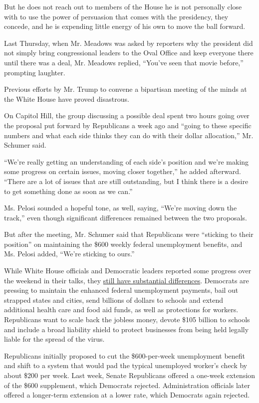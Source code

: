 But he does not reach out to members of the House he is not personally
close with to use the power of persuasion that comes with the
presidency, they concede, and he is expending little energy of his own
to move the ball forward.

Last Thursday, when Mr. Meadows was asked by reporters why the president
did not simply bring congressional leaders to the Oval Office and keep
everyone there until there was a deal, Mr. Meadows replied, ``You've
seen that movie before,'' prompting laughter.

Previous efforts by Mr. Trump to convene a bipartisan meeting of the
minds at the White House have proved disastrous.

On Capitol Hill, the group discussing a possible deal spent two hours
going over the proposal put forward by Republicans a week ago and
``going to these specific numbers and what each side thinks they can do
with their dollar allocation,'' Mr. Schumer said.

``We're really getting an understanding of each side's position and
we're making some progress on certain issues, moving closer together,''
he added afterward. ``There are a lot of issues that are still
outstanding, but I think there is a desire to get something done as soon
as we can.''

Ms. Pelosi sounded a hopeful tone, as well, saying, ``We're moving down
the track,'' even though significant differences remained between the
two proposals.

But after the meeting, Mr. Schumer said that Republicans were ``sticking
to their position'' on maintaining the \$600 weekly federal unemployment
benefits, and Ms. Pelosi added, ``We're sticking to ours.''

While White House officials and Democratic leaders reported some
progress over the weekend in their talks, they
\href{https://www.nytimes3xbfgragh.onion/2020/08/02/us/politics/coronavirus-jobless-aid.html}{still
have substantial differences}. Democrats are pressing to maintain the
enhanced federal unemployment payments, bail out strapped states and
cities, send billions of dollars to schools and extend additional health
care and food aid funds, as well as protections for workers. Republicans
want to scale back the jobless money, devote \$105 billion to schools
and include a broad liability shield to protect businesses from being
held legally liable for the spread of the virus.

Republicans initially proposed to cut the \$600-per-week unemployment
benefit and shift to a system that would pad the typical unemployed
worker's check by about \$200 per week. Last week, Senate Republicans
offered a one-week extension of the \$600 supplement, which Democrats
rejected. Administration officials later offered a longer-term extension
at a lower rate, which Democrats again rejected.

